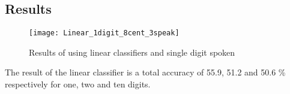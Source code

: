 \subsection*{Results}

\begin{figure}[H]
\centering
\texttt{[image: Linear\_1digit\_8cent\_3speak]}
\caption{Results of using linear classifiers and single digit spoken}
\label{fig:Lin_fig_1}
\end{figure}

The result of the linear classifier is a total accuracy of 55.9, 51.2 and 50.6 \% respectively for one, two and ten digits. 
